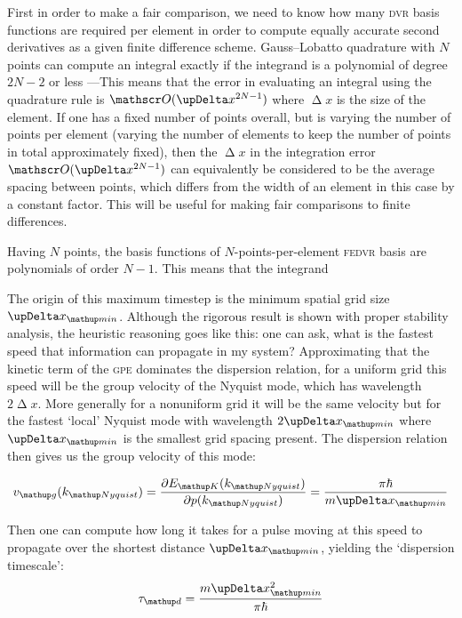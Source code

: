 First in order to make a fair comparison, we need to know how many \textsc{dvr} basis functions are required per element in order to compute equally accurate second derivatives as a given finite difference scheme. Gauss--Lobatto quadrature with $N$ points can compute an integral exactly if the integrand is a polynomial of degree $2N - 2$ or less \cite{schneider_discrete_2005}---This means that the error in evaluating an integral using the quadrature rule is $\Ord{\upDelta x^{2N - 1}}$ where $\upDelta x$ is the size of the element. If one has a fixed number of points overall, but is varying the number of points per element (varying the number of elements to keep the number of points in total approximately fixed), then the $\upDelta x$ in the integration error $\Ord{\upDelta x^{2N - 1}}$ can equivalently be considered to be the average spacing between points, which differs from the width of an element in this case by a constant factor. This will be useful for making fair comparisons to finite differences.

Having $N$ points, the basis functions of $N$-points-per-element \textsc{fedvr} basis are polynomials of order $N - 1$. This means that the integrand

The origin of this maximum timestep is the minimum spatial grid size $\upDelta x_\up {min}$. Although the rigorous result is shown with proper stability analysis, the heuristic reasoning goes like this: one can ask, what is the fastest speed that information can propagate in my system? Approximating that the kinetic term of the \textsc{gpe} dominates the dispersion relation, for a uniform grid this speed will be the group velocity of the Nyquist mode, which has wavelength $2\upDelta x$. More generally for a nonuniform grid it will be the same velocity but for the fastest `local' Nyquist mode with wavelength $2\upDelta x_\up {min}$ where $\upDelta x_\up {min}$ is the smallest grid spacing present. The dispersion relation then gives us the group velocity of this mode:

\begin{equation}
v_\up{g}(k_\up{Nyquist}) = \pdv{E_\up{K}(k_\up{Nyquist})}{p(k_\up{Nyquist})} =  \frac{\pi \hbar}{m \upDelta x_\up{min}}
\end{equation}

Then one can compute how long it takes for a pulse moving at this speed to propagate over the shortest distance $\upDelta x_\up{min}$, yielding the `dispersion timescale':
\begin{equation}
\tau_\up d = \frac{m\upDelta x_\up{min}^2 }{\pi \hbar}
\end{equation} 

